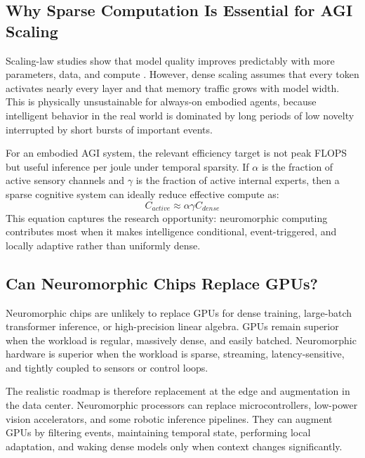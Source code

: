 \documentclass[11pt]{article}
\begin{document}
\subsection{Why Sparse Computation Is Essential for AGI Scaling}
Scaling-law studies show that model quality improves predictably with more parameters, data, and compute \cite{kaplan2020scaling,hoffmann2022chinchilla}. However, dense scaling assumes that every token activates nearly every layer and that memory traffic grows with model width. This is physically unsustainable for always-on embodied agents, because intelligent behavior in the real world is dominated by long periods of low novelty interrupted by short bursts of important events.

For an embodied AGI system, the relevant efficiency target is not peak FLOPS but useful inference per joule under temporal sparsity. If $\alpha$ is the fraction of active sensory channels and $\gamma$ is the fraction of active internal experts, then a sparse cognitive system can ideally reduce effective compute as:
$$C_{active}\approx \alpha\gamma C_{dense}$$
This equation captures the research opportunity: neuromorphic computing contributes most when it makes intelligence conditional, event-triggered, and locally adaptive rather than uniformly dense.

\subsection{Can Neuromorphic Chips Replace GPUs?}
Neuromorphic chips are unlikely to replace GPUs for dense training, large-batch transformer inference, or high-precision linear algebra. GPUs remain superior when the workload is regular, massively dense, and easily batched. Neuromorphic hardware is superior when the workload is sparse, streaming, latency-sensitive, and tightly coupled to sensors or control loops.

The realistic roadmap is therefore replacement at the edge and augmentation in the data center. Neuromorphic processors can replace microcontrollers, low-power vision accelerators, and some robotic inference pipelines. They can augment GPUs by filtering events, maintaining temporal state, performing local adaptation, and waking dense models only when context changes significantly.
\end{document}
